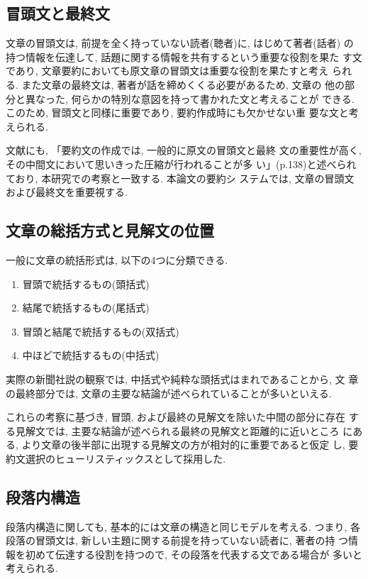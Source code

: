 \subsection{冒頭文と最終文}
文章の冒頭文は, 前提を全く持っていない読者(聴者)に, はじめて著者(話者)
の持つ情報を伝達して, 話題に関する情報を共有するという重要な役割を果た
す文であり, 文章要約においても原文章の冒頭文は重要な役割を果たすと考え
られる. また文章の最終文は, 著者が話を締めくくる必要があるため, 文章の
他の部分と異なった, 何らかの特別な意図を持って書かれた文と考えることが
できる. このため, 冒頭文と同様に重要であり, 要約作成時にも欠かせない重
要な文と考えられる. 

文献\cite{要約本}にも, 「要約文の作成では, 一般的に原文の冒頭文と最終
文の重要性が高く, その中間文において思いきった圧縮が行われることが多
い」(p.138)と述べられており, 本研究での考察と一致する. 本論文の要約シ
ステムでは, 文章の冒頭文および最終文を重要視する. 


\subsection{文章の総括方式と見解文の位置}

一般に文章の統括形式は, 以下の4つに分類できる\cite{市川}. 

\begin{enumerate}
\item 冒頭で統括するもの(頭括式)
\item 結尾で統括するもの(尾括式)
\item 冒頭と結尾で統括するもの(双括式)
\item 中ほどで統括するもの(中括式)
\end{enumerate}

実際の新聞社説の観察では, 中括式や純粋な頭括式はまれであることから, 文
章の最終部分では, 文章の主要な結論が述べられていることが多いといえる.

これらの考察に基づき, 冒頭, および最終の見解文を除いた中間の部分に存在
する見解文では, 主要な結論が述べられる最終の見解文と距離的に近いところ
にある, より文章の後半部に出現する見解文の方が相対的に重要であると仮定
し, 要約文選択のヒューリスティックスとして採用した.

\subsection{段落内構造}
段落内構造に関しても, 基本的には文章の構造と同じモデルを考える. つまり, 
各段落の冒頭文は, 新しい主題に関する前提を持っていない読者に, 著者の持
つ情報を初めて伝達する役割を持つので, その段落を代表する文である場合が
多いと考えられる. 


